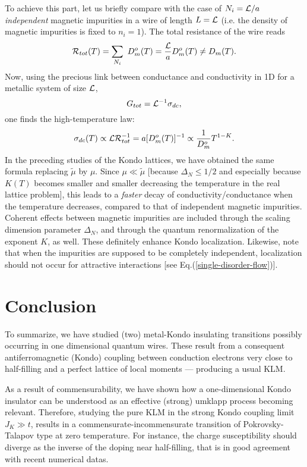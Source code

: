 To achieve this part, let us briefly compare with the case
of $N_i={\cal L}/a$ {\it independent} magnetic impurities in
a wire of length $L={\cal L}$ (i.e.
the density of magnetic impurities is fixed to $n_i=1$). 
The total resistance
of the wire reads
\begin{equation}
{\cal R}_{tot}(T)=\sum_{N_i}\ D_m^{o}(T)=
\frac{{\cal L}}{a}D_m^{o}(T)\neq D_m(T).
\end{equation}
Now, using the precious link between conductance and conductivity in 1D
for a metallic system of size ${\cal L}$,
\begin{equation}
\label{uni}
G_{tot}={\cal L}^{-1}\sigma_{dc},
\end{equation}
one finds the high-temperature law:
\begin{equation}
\sigma_{dc}(T)\propto {\cal L}{\cal R}_{tot}^{-1}=a[D_m^{o}(T)]^{-1}\propto
\frac{1}{D_m^{o}}T^{1-K}.
\end{equation}
In the preceding studies of the Kondo lattices, we have obtained 
the same formula
replacing $\tilde{\mu}$ by $\mu$. 
Since $\mu\ll\tilde{\mu}$ [because
$\Delta_N\leq 1/2$ and especially because $K(T)$ becomes smaller and smaller
decreasing the temperature in the real
lattice problem], this leads to a {\it faster} decay of
conductivity/conductance
when the temperature decreases, compared to that of independent magnetic
impurities. 
Coherent effects between magnetic impurities are included
through the scaling dimension parameter
$\Delta_N$, and through the quantum
renormalization of the exponent $K$, as well. These definitely enhance Kondo
localization. Likewise, 
note that when the impurities are supposed to be completely
independent, localization should not occur for attractive interactions [see
Eq.(\ref{single-disorder-flow})].

\section{Conclusion}

To summarize, 
we have studied (two) metal-Kondo insulating transitions
possibly occurring in one dimensional quantum wires. These
result from a consequent antiferromagnetic (Kondo)
coupling between conduction
electrons very close to half-filling and a perfect lattice of local moments
--- producing a usual KLM. 

As a result of commensurability, we have shown how a
one-dimensional Kondo insulator can be understood as an effective (strong)
umklapp process becoming relevant. Therefore, studying the pure KLM 
in the strong Kondo coupling limit $J_K\gg t$, results in a
commensurate-incommensurate
transition of Pokrovsky-Talapov type at zero temperature. 
For instance, the charge
susceptibility should diverge as the inverse of the doping near half-filling,
that is in good agreement with recent numerical datas\cite{Shibata}. 

